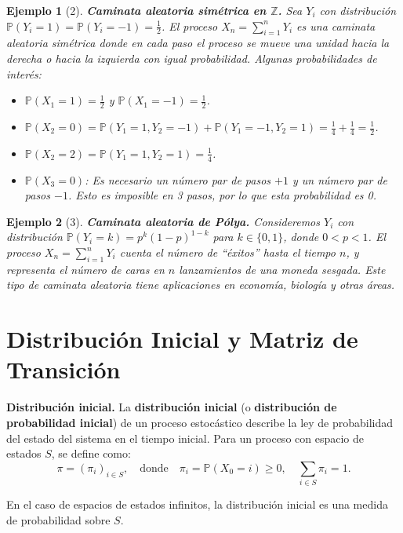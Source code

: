 \documentclass[12pt]{book}
\newtheorem{example}{Ejemplo}[chapter]
\begin{document}
\begin{example}[2]
\textbf{Caminata aleatoria simétrica en $\mathbb{Z}$.} Sea $Y_i$ con distribución $\mathbb{P}(Y_i = 1) = \mathbb{P}(Y_i = -1) = \frac{1}{2}$. El proceso $X_n = \sum_{i=1}^n Y_i$ es una caminata aleatoria simétrica donde en cada paso el proceso se mueve una unidad hacia la derecha o hacia la izquierda con igual probabilidad. Algunas probabilidades de interés:
\begin{itemize}
    \item $\mathbb{P}(X_1 = 1) = \frac{1}{2}$ y $\mathbb{P}(X_1 = -1) = \frac{1}{2}$.
    \item $\mathbb{P}(X_2 = 0) = \mathbb{P}(Y_1 = 1, Y_2 = -1) + \mathbb{P}(Y_1 = -1, Y_2 = 1) = \frac{1}{4} + \frac{1}{4} = \frac{1}{2}$.
    \item $\mathbb{P}(X_2 = 2) = \mathbb{P}(Y_1 = 1, Y_2 = 1) = \frac{1}{4}$.
    \item $\mathbb{P}(X_3 = 0)$: Es necesario un número par de pasos $+1$ y un número par de pasos $-1$. Esto es imposible en 3 pasos, por lo que esta probabilidad es 0.
\end{itemize}
\end{example}

\begin{example}[3]
\textbf{Caminata aleatoria de Pólya.} Consideremos $Y_i$ con distribución $\mathbb{P}(Y_i = k) = p^k(1-p)^{1-k}$ para $k \in \{0, 1\}$, donde $0 < p < 1$. El proceso $X_n = \sum_{i=1}^n Y_i$ cuenta el número de ``éxitos'' hasta el tiempo $n$, y representa el número de caras en $n$ lanzamientos de una moneda sesgada. Este tipo de caminata aleatoria tiene aplicaciones en economía, biología y otras áreas.
\end{example}

\section{Distribución Inicial y Matriz de Transición}

\textbf{Distribución inicial.} La \textbf{distribución inicial} (o \textbf{distribución de probabilidad inicial}) de un proceso estocástico describe la ley de probabilidad del estado del sistema en el tiempo inicial. Para un proceso con espacio de estados $S$, se define como:
\[
\pi = (\pi_i)_{i \in S}, \quad \text{donde} \quad \pi_i = \mathbb{P}(X_0 = i) \geq 0, \quad \sum_{i \in S} \pi_i = 1.
\]

En el caso de espacios de estados infinitos, la distribución inicial es una medida de probabilidad sobre $S$.
\end{document}
